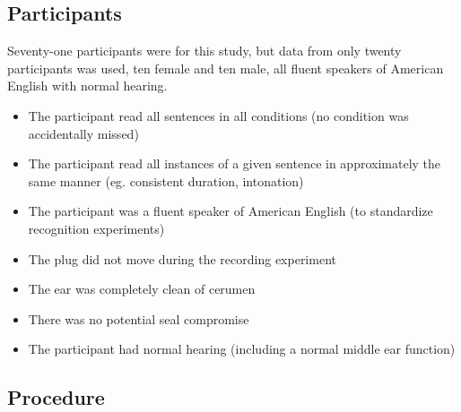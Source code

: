 \subsection{Participants}\DIFaddbegin \label{chap2:methods:participants}
\DIFaddend Seventy-one participants were \DIFdelbegin {}\DIFdelend \DIFaddbegin {}\DIFaddend for this study, but data from only twenty participants was used, ten female and ten male, all fluent speakers of American English with normal hearing.  \DIFaddbegin {}

\begin{itemize}
\item{The participant read all sentences in all conditions (no condition was accidentally missed)}
\item{The participant read all instances of a given sentence in approximately the same manner (eg. consistent duration, intonation)}
\item{The participant was a fluent speaker of American English (to standardize recognition experiments)}
\item{The plug did not move during the recording experiment}
\item{The ear was completely clean of cerumen}
\item{There was no potential seal compromise}
\item{The participant had normal hearing (including a normal middle ear function)}
\end{itemize}

\DIFaddend 

\subsection{Procedure}\label{chap2:methods:procedure}


